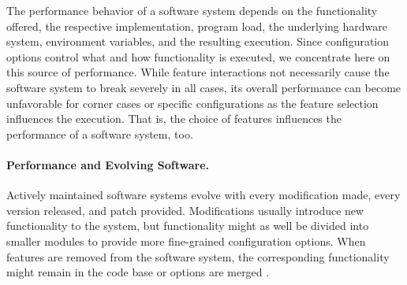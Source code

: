 The performance behavior of a software system depends on the functionality
offered, the respective implementation, program load, the underlying hardware system,
environment variables, and the resulting execution. Since configuration options
control what and how functionality is executed, we concentrate here on this
source of performance. While feature interactions not necessarily cause the
software system to break severely in all cases, its overall performance can
become unfavorable for corner cases or specific configurations as the feature
selection influences the execution. 
That is, the choice of features influences the performance of a software system,
too.

\paragraph{Performance and Evolving Software.}
Actively maintained software systems evolve with every modification made, every
version released,  and patch provided. Modifications usually introduce new
functionality to the system, but functionality might as well be divided into
smaller modules to provide more fine-grained configuration options. When
features are removed from the software system, the corresponding functionality
might remain in the code base or options are merged
\citep{apel_feature-oriented_2013}.

